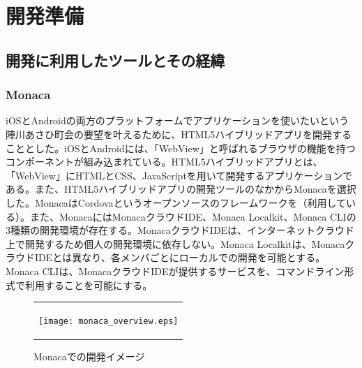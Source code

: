 \chapter{開発準備}

\section{開発に利用したツールとその経緯}%
\subsection{Monaca}%
iOSとAndroidの両方のプラットフォームでアプリケーションを使いたいという陣川あさひ町会の要望を叶えるために、HTML5ハイブリッドアプリを開発することとした。iOSとAndroidには、「WebView」と呼ばれるブラウザの機能を持つコンポーネントが組み込まれている。HTML5ハイブリッドアプリとは、「WebView」にHTMLとCSS、JavaScriptを用いて開発するアプリケーションである。また、HTML5ハイブリッドアプリの開発ツールのなかからMonacaを選択した。MonacaはCordovaというオープンソースのフレームワークを（利用している）。また、MonacaにはMonacaクラウドIDE、Monaca Localkit、Monaca CLIの3種類の開発環境が存在する。MonacaクラウドIDEは、インターネットクラウド上で開発するため個人の開発環境に依存しない。Monaca Localkitは、MonacaクラウドIDEとは異なり、各メンバごとにローカルでの開発を可能とする。Monaca CLIは、MonacaクラウドIDEが提供するサービスを、コマンドライン形式で利用することを可能にする。

\begin{figure}[h]
  \begin{center}
    \begin{tabular}{c}

      \begin{minipage}{0.7\hsize}
        \begin{center}
\texttt{[image: monaca\_overview.eps]}
          \hspace{1cm} %
        \end{center}
      \end{minipage}

    \end{tabular}
    \caption{Monacaでの開発イメージ}
    \label{fig:lena}
  \end{center}
\end{figure}

